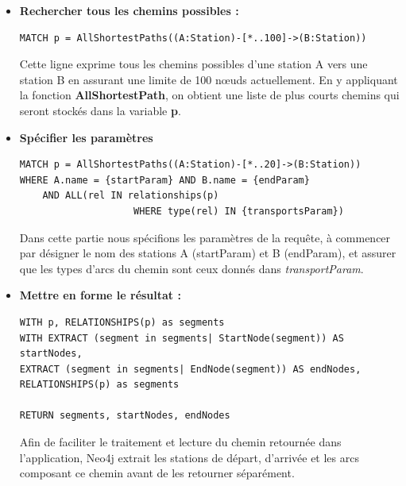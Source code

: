 \begin{itemize}

\item \textbf{Rechercher tous les chemins possibles :}
 \begin{lstlisting}[style=cypher]
MATCH p = AllShortestPaths((A:Station)-[*..100]->(B:Station))
\end{lstlisting}
Cette ligne exprime tous les chemins possibles d'une station A vers une station B en assurant une limite de 100 nœuds actuellement. En y appliquant la fonction \textbf{AllShortestPath}, on obtient une liste de plus courts chemins qui seront stockés dans la variable \textbf{p}.

\item \textbf{Spécifier les paramètres}
 \begin{lstlisting}[style=cypher]
MATCH p = AllShortestPaths((A:Station)-[*..20]->(B:Station))
WHERE A.name = {startParam} AND B.name = {endParam}
	AND ALL(rel IN relationships(p) 
					WHERE type(rel) IN {transportsParam})
\end{lstlisting}
Dans cette partie nous spécifions les paramètres de la requête, à commencer par désigner le nom des stations A (startParam) et B (endParam), et assurer que les types d'arcs du chemin sont ceux donnés dans \emph{transportParam}.

\item \textbf{Mettre en forme le résultat :}
 \begin{lstlisting}[style=cypher]
WITH p, RELATIONSHIPS(p) as segments
WITH EXTRACT (segment in segments| StartNode(segment)) AS startNodes,
EXTRACT (segment in segments| EndNode(segment)) AS endNodes,
RELATIONSHIPS(p) as segments

RETURN segments, startNodes, endNodes

\end{lstlisting}

Afin de faciliter le traitement et lecture du chemin retournée dans l'application, Neo4j extrait les stations de départ, d'arrivée et les arcs composant ce chemin  avant de les retourner séparément.
\end{itemize}

%
%
%            

